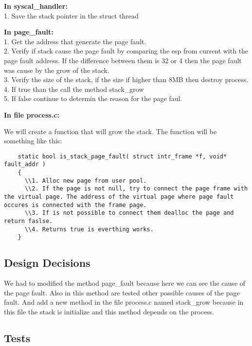 \textbf{In syscal\_handler:}
	  \\1. Save the stack pointer in the struct thread

\textbf{In page\_fault:}
	  \\1. Get the address that generate the page fault.
	  \\2. Verify if stack cause the page fault by comparing the esp from current with the page fault address. If the difference between them is 32 or 4 then the page fault was cause by the grow of the stack.
	  \\3. Verify the size of the stack, if the size if higher than 8MB then destroy process.
	  \\4. If true than the call the method stack\_grow
	  \\5. If false continue to determin the reason for the page faul.

\textbf{In file process.c: }

We will create a function that will grow the stack. The function will be something like this:

\begin{lstlisting}
    static bool is_stack_page_fault( struct intr_frame *f, void* fault_addr )
    {
      \\1. Alloc new page from user pool.
      \\2. If the page is not null, try to connect the page frame with the virtual page. The address of the virtual page where page fault occures is connected with the frame page.
      \\3. If is not possible to connect them dealloc the page and return faslse.
      \\4. Returns true is everthing works.
    }
\end{lstlisting}


\subsection{Design Decisions}

We had to modified the method page\_fault because here we can see the cause of the page fault. Also in this method are tested other possible causes of the page fault. And add a new method in the file process.c named stack\_grow because in this file the stack is initialize and this method depends on the process.


\subsection{Tests}

